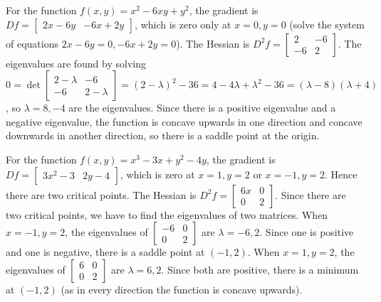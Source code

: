 %


\begin{example} 
  For the function {$f(x,y)=x^2-6xy+y^2$}, the gradient is $Df =
  \begin{bmatrix}2x-6y&-6x+2y \end{bmatrix}$, which is zero only at
  $x=0,y=0$ (solve the system of equations $2x-6y=0,-6x+2y=0$). The
  Hessian is $D^2f = \begin{bmatrix}2&-6 \\-6&2\end{bmatrix}$. The
  eigenvalues are found by solving $0=\det \begin{bmatrix}2-\lambda
    &-6 \\-6&2-\lambda \end{bmatrix} = (2-\lambda)^2-36 =
  4-4\lambda+\lambda^2 -36 = (\lambda-8)(\lambda+4)$, so $\lambda =
  8,-4$ are the eigenvalues.  Since there is a positive eigenvalue and
  a negative eigenvalue, the function is concave upwards in one
  direction and concave downwards in another direction, so there is a
  saddle point at the origin.
\end{example}

\begin{example}
  For the function {$f(x,y)=x^3-3x+y^2-4y$}, the gradient is $Df =
  \begin{bmatrix}3x^2-3&2y-4 \end{bmatrix}$, which is zero at
  $x=1,y=2$ or $x=-1,y=2$. Hence there are two critical points. The
  Hessian is $D^2f = \begin{bmatrix}6x&0 \\0&2\end{bmatrix}$. Since
  there are two critical points, we have to find the eigenvalues of
  two matrices.  When $x=-1,y=2$, the eigenvalues of
  $\begin{bmatrix}-6&0 \\0&2\end{bmatrix}$ are $\lambda=-6,2$. Since
  one is positive and one is negative, there is a saddle point at
  $(-1,2)$. When $x=1,y=2$, the eigenvalues of $\begin{bmatrix}6&0
    \\0&2\end{bmatrix}$ are $\lambda=6,2$.  Since both are positive,
  there is a minimum at $(-1,2)$ (as in every direction the function
  is concave upwards).
\end{example}

